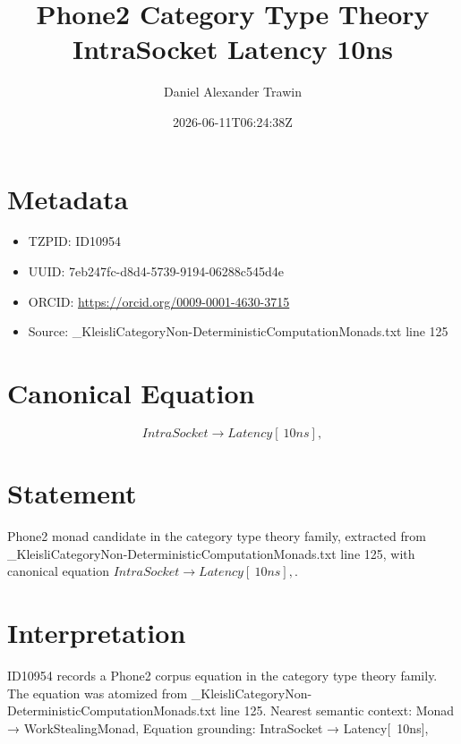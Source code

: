 \documentclass[11pt]{article}
\title{Phone2 Category Type Theory IntraSocket Latency 10ns}
\author{Daniel Alexander Trawin}
\date{2026-06-11T06:24:38Z}
\begin{document}
\maketitle
\section*{Metadata}
\begin{itemize}
\item TZPID: ID10954
\item UUID: 7eb247fc-d8d4-5739-9194-06288c545d4e
\item ORCID: \url{https://orcid.org/0009-0001-4630-3715}
\item Source: _KleisliCategoryNon-DeterministicComputationMonads.txt line 125
\end{itemize}
\section*{Canonical Equation}
\[
IntraSocket → Latency[~10ns],
\]
\section*{Statement}
Phone2 monad candidate in the category type theory family, extracted from _KleisliCategoryNon-DeterministicComputationMonads.txt line 125, with canonical equation $IntraSocket → Latency[~10ns],$.
\section*{Interpretation}
ID10954 records a Phone2 corpus equation in the category type theory family. The equation was atomized from _KleisliCategoryNon-DeterministicComputationMonads.txt line 125. Nearest semantic context: Monad → WorkStealingMonad, Equation grounding: IntraSocket → Latency[~10ns],
\end{document}
